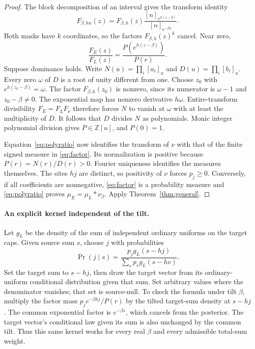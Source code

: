 \documentclass[11pt,a4paper]{article}
\theoremstyle{remark}\newtheorem*{ednote}{Editorial note (ProveIt, 2026-10-01)}
\begin{document}
\begin{proof}
The block decomposition of an interval gives the transform identity
\begin{equation}\label{eq:block}
 F_{\beta,hn}(z)=F_{\beta,h}(z)
 \frac{[n]_{e^{h(z-\beta)}}}{[n]_{e^{-\beta h}}}.
\end{equation}
Both masks have $k$ coordinates, so the factors $F_{\beta,h}(z)^k$ cancel. Near zero,
\begin{equation}\label{eq:polyratio}
 \frac{F_E(z)}{F_L(z)}
 =\frac{P(e^{h(z-\beta)})}{P(r)}.
\end{equation}
Suppose dominance holds. Write $N(u)=\prod_i[a_i]_u$ and $D(u)=\prod_i[b_i]_u$. Every zero $\omega$ of $D$ is a root of unity different from one. Choose $z_0$ with $e^{h(z_0-\beta)}=\omega$. The factor $F_{\beta,h}(z_0)$ is nonzero, since its numerator is $\omega-1$ and $z_0-\beta\ne0$. The exponential map has nonzero derivative $h\omega$. Entire-transform divisibility $F_E=F_LF_\nu$ therefore forces $N$ to vanish at $\omega$ with at least the multiplicity of $D$. It follows that $D$ divides $N$ as polynomials. Monic integer polynomial division gives $P\in\mathbb Z[u]$, and $P(0)=1$.

Equation~\eqref{eq:polyratio} now identifies the transform of $\nu$ with that of the finite signed measure in \eqref{eq:factor}. Its normalization is positive because $P(r)=N(r)/D(r)>0$. Fourier uniqueness identifies the measures themselves. The sites $hj$ are distinct, so positivity of $\nu$ forces $p_j\ge0$. Conversely, if all coefficients are nonnegative, \eqref{eq:factor} is a probability measure and \eqref{eq:polyratio} proves $\mu_E=\mu_L*\nu_\beta$. Apply Theorem~\ref{thm:general}.
\end{proof}

\paragraph{An explicit kernel independent of the tilt.}
Let $g_L$ be the density of the sum of independent ordinary uniforms on the target caps. Given source sum $s$, choose $j$ with probabilities
\begin{equation}\label{eq:posterior}
 \Pr(j\mid s)=
 \frac{p_jg_L(s-hj)}{\sum_vp_vg_L(s-hv)}.
\end{equation}
Set the target sum to $s-hj$, then draw the target vector from its ordinary-uniform conditional distribution given that sum. Set arbitrary values where the denominator vanishes; that set is source-null. To check the formula under tilt $\beta$, multiply the factor mass $p_je^{-\beta hj}/P(r)$ by the tilted target-sum density at $s-hj$. The common exponential factor is $e^{-\beta s}$, which cancels from the posterior. The target vector's conditional law given its sum is also unchanged by the common tilt. Thus this same kernel works for every real $\beta$ and every admissible total-sum weight.
\end{document}
